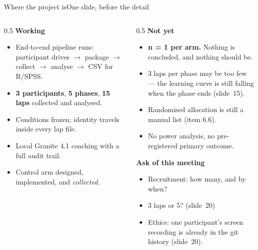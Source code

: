 \documentclass[aspectratio=169,10pt]{beamer}
\newcommand{\kw}[1]{\textcolor{cblue}{\textbf{#1}}}
\newcommand{\good}[1]{\textcolor{cgreen}{#1}}
\newcommand{\bad}[1]{\textcolor{cred}{#1}}
\newcommand{\warn}[1]{\textcolor{camber}{#1}}
\begin{document}
\begin{frame}{Where the project is}{One slide, before the detail}
  \begin{columns}[T]
  \begin{column}{0.5\textwidth}
  \textbf{\good{Working}}
  \begin{itemize}\footnotesize
    \item End-to-end pipeline runs: participant drives $\rightarrow$ package
      $\rightarrow$ collect $\rightarrow$ analyse $\rightarrow$ CSV for R/SPSS.
    \item \kw{3 participants}, \kw{5 phases}, \kw{15 laps} collected and analysed.
    \item Conditions frozen; identity travels inside every lap file.
    \item Local Granite 4.1 coaching with a full audit trail.
    \item Control arm designed, implemented, and \emph{collected}.
  \end{itemize}
  \end{column}
  \begin{column}{0.5\textwidth}
  \textbf{\bad{Not yet}}
  \begin{itemize}\footnotesize
    \item \kw{n = 1 per arm.} Nothing is concluded, and nothing should be.
    \item 3 laps per phase may be too few --- the learning curve is still
      falling when the phase ends (slide~15).
    \item Randomised allocation is still a manual list (item 6.6).
    \item No power analysis, no pre-registered primary outcome.
  \end{itemize}
  \vspace{0.4em}
  \textbf{\warn{Ask of this meeting}}
  \begin{itemize}\footnotesize
    \item Recruitment: how many, and by when?
    \item 3 laps or 5? (slide~20)
    \item Ethics: one participant's screen recording is already in the git
      history (slide~20).
  \end{itemize}
  \end{column}
  \end{columns}
\end{frame}
\end{document}
